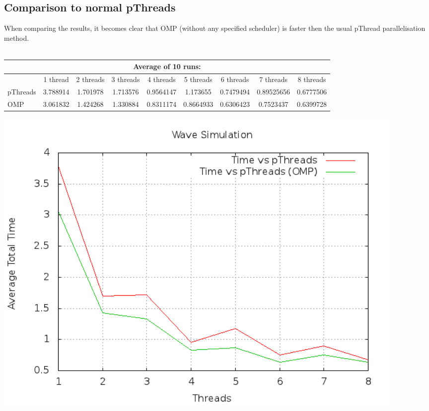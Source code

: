 \documentclass[a4paper]{article}
\begin{document}
    
  \subsection{Comparison to normal pThreads}
    When comparing the results, it becomes clear that OMP (without any specified scheduler) is faster then the usual pThread parallelisation method.\\\\
    \begin{tabular}{| l | c | c | c | c | c | c | c | c |}
      \hline
      \multicolumn{9}{|c|}{Average of 10 runs:}\\
      \hline
      & 1 thread & 2 threads & 3 threads & 4 threads & 5 threads & 6 threads & 7 threads & 8 threads\\
      \hline
      pThreads & 3.788914 & 1.701978 & 1.713576 & 0.9564147 & 1.173655 & 0.7479494 & 0.89525656 & 0.6777506\\
      \hline
      OMP & 3.061832 & 1.424268 & 1.330884 & 0.8311174 & 0.8664933 & 0.6306423 & 0.7523437 & 0.6399728\\
      \hline
    \end{tabular}
    \begin{center}
      \includegraphics[width=0.9\textwidth]{speedplot.png}
    \end{center}
    
\end{document}
